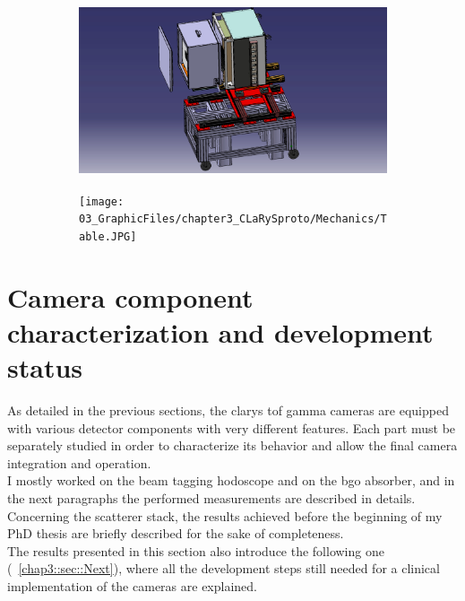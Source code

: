 \begin{figure}
\begin{subfigure}[t]{.5\textwidth}
\centering
\includegraphics[width=1\textwidth, trim= {1cm 0 1cm 0}, clip = true, height=5cm]{03_GraphicFiles/chapter3_CLaRySproto/Mechanics/TableCameraSchemeBlue.jpg}
\caption{}
\label{chap3::fig::schemeTable}
\end{subfigure}
\begin{subfigure}[t]{.5\textwidth}
\centering
\texttt{[image: 03\_GraphicFiles/chapter3\_CLaRySproto/Mechanics/Table.JPG]}
\caption{}
\label{chap3::fig::pictureTable}
\end{subfigure}
\caption{}
\label{chap3::fig::CameraIntegration}
\end{figure}


\section{Camera component characterization and development status}\label{chap3::sec::charMeasurements}

As detailed in the previous sections, the \gls{clarys} \gls{tof} gamma cameras are equipped with various detector components with very different features. Each part must be separately studied in order to characterize its behavior and allow the final camera integration and operation.\\
I mostly worked on the beam tagging hodoscope and on the \gls{bgo} absorber, and in the next paragraphs the performed measurements are described in details. Concerning the scatterer stack, the results achieved before the beginning of my PhD thesis are briefly described for the sake of completeness.\\
The results presented in this section also introduce the following one (~\ref{chap3::sec::Next}), where all the development steps still needed for a clinical implementation of the cameras are explained.\\

